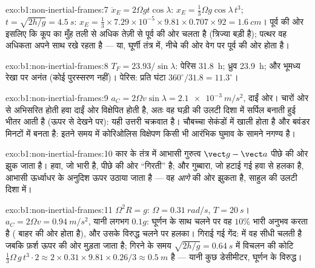 \begin{solution}{exo:b1:non-inertial-frames:7}
$\ddot x_E = 2\Omega gt\cos\lambda$: $x_E = \tfrac13\Omega g\cos\lambda\,t^3$; $t =
\sqrt{2h/g} = \qty{4.5}{s}$: $x_E = \tfrac13 \times 7.29\times10^{-5} \times 9.81
\times 0.707 \times 92 = \qty{1.6}{cm}$। पूर्व की ओर इसलिए कि कूप का मुँह
तली से अधिक तेज़ी से पूर्व की ओर चलता है (त्रिज्या बड़ी है); पत्थर वह
अधिकता अपने साथ रखे रहता है --- या, घूर्णी तंत्र में, नीचे की ओर वेग पर
 पूर्व की ओर होता है।
\end{solution}

\begin{solution}{exo:b1:non-inertial-frames:8}
$T_F = 23.93/\sin\lambda$:
पेरिस \qty{31.8}{h}; ध्रुव \qty{23.9}{h};
और भूमध्य रेखा पर अनंत (कोई पुरस्सरण नहीं)।
पेरिस: प्रति घंटा $360^\circ/31.8 = 11.3^\circ$।
\end{solution}

\begin{solution}{exo:b1:non-inertial-frames:9}
$a_C = 2\Omega v\sin\lambda = \qty{2.1e-3}{m/s^2}$, दाईं ओर। चारों ओर से
अभिसरित होती हवा दाईं ओर विक्षेपित होती है, अतः वह घड़ी की उलटी दिशा में
सर्पिल बनाती हुई भीतर आती है (ऊपर से देखने पर): यही उत्तरी चक्रवात है।
चौबच्चा सेकंडों में खाली होता है और बवंडर मिनटों में बनता है: इतने समय में
कोरिओलिस विक्षेपण किसी भी आरंभिक घुमाव के सामने नगण्य है।
\end{solution}

\begin{solution}{exo:b1:non-inertial-frames:10}
कार के तंत्र में आभासी गुरुत्व $\vect g - \vect a$ पीछे की ओर झुक जाता है।
हवा, जो भारी है, पीछे की ओर ``गिरती'' है; और गुब्बारा, जो हटाई गई हवा से
हलका है, आभासी ऊर्ध्वाधर के अनुदिश ऊपर उठाया जाता है --- वह
\emph{आगे} की ओर झुकता है, साहुल की उलटी दिशा में।
\end{solution}

\begin{solution}{exo:b1:non-inertial-frames:11}
$\Omega^2R = g$: $\Omega = \qty{0.31}{rad/s}$, $T = \qty{20}{s}$। $a_C = 2\Omega v
= \qty{0.94}{m/s^2}$, यानी लगभग $0.1g$: घूर्णन के साथ चलने पर वह
$10\%$ भारी अनुभव करता है ( बाहर की ओर होता है), और उसके
विरुद्ध चलने पर हलका। गिराई गई गेंद:  में वह सीधी चलती है
जबकि फ़र्श ऊपर की ओर मुड़ता जाता है; गिरने के समय $\sqrt{2h/g} = \qty{0.64}{s}$ में
विचलन की कोटि $\tfrac13\Omega\,g\,t^3 \cdot 2 \approx 2 \times 0.31 \times
9.81 \times 0.26/3 \approx \qty{0.5}{m}$ है --- यानी कुछ डेसीमीटर, घूर्णन
के विरुद्ध।
\end{solution}

